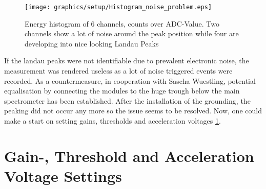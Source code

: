   \begin{figure}
   \centering
   \texttt{[image: graphics/setup/Histogram\_noise\_problem.eps]}
   \caption[6 channel energy Histogram with noise]{Energy histogram of 6 channels, counts over ADC-Value. Two channels show a lot of noise around the peak position while four are developing into nice looking Landau Peaks}
  \end{figure}
  If the landau peaks were not identifiable due to prevalent electronic noise, the measurement was rendered useless as a lot of noise triggered events were recorded.
  As a countermeasure, in cooperation with Sascha Wuestling, potential equalisation by connecting the modules to the huge trough below the main spectrometer has been established. After the installation of the grounding, the peaking did not occur any more so the issue seems to be resolved. Now, one could make a start on setting gains, thresholds and acceleration voltages \ref{ch:Analysis:sec:GainsThresholdsAccVoltages}.
  
  \section{Gain-, Threshold and Acceleration Voltage Settings}
  \label{ch:Analysis:sec:GainsThresholdsAccVoltages}
  
